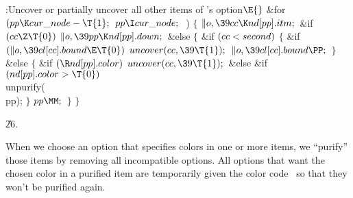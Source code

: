 \Y\B\4:Uncover or partially uncover all other items of 's
option\X${}\E{}$\6
\&{for} ${}(\\{pp}\K\\{cur\_node}-\T{1};{}$ ${}\\{pp}\I\\{cur\_node};{}$ \,)\5
${}\{{}$\1\6
${}\|o,\39\\{cc}\K\\{nd}[\\{pp}].\\{itm};{}$\6
\&{if} ${}(\\{cc}\Z\T{0}){}$\1\5
${}\|o,\39\\{pp}\K\\{nd}[\\{pp}].\\{down};{}$\2\6
\&{else}\5
${}\{{}$\1\6
\&{if} ${}(\\{cc}<\\{second}){}$\5
${}\{{}$\1\6
\&{if} ${}(\|o,\39\\{cl}[\\{cc}].\\{bound}\E\T{0}){}$\1\5
${}\\{uncover}(\\{cc},\39\T{1});{}$\2\6
${}\|o,\39\\{cl}[\\{cc}].\\{bound}\PP;{}$\6
\4${}\}{}$\5
\2\&{else}\5
${}\{{}$\1\6
\&{if} ${}(\R\\{nd}[\\{pp}].\\{color}){}$\1\5
${}\\{uncover}(\\{cc},\39\T{1});{}$\2\6
\&{else} \&{if} ${}(\\{nd}[\\{pp}].\\{color}>\T{0}){}$\1\5
\\{unpurify}(\\{pp});\2\6
\4${}\}{}$\2\6
${}\\{pp}\MM;{}$\6
\4${}\}{}$\2\6
\4${}\}{}$\2\par
\U26.\fi

When we choose an option that specifies colors in one or more items,
we ``purify'' those items by removing all incompatible options.
All options that want the chosen color in a purified item are temporarily
given the color code~ so that they won't be purified again.

